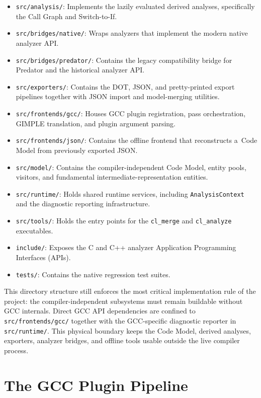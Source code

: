 \documentclass[xpsejal00-gcc-plugin.tex]{subfiles}
\begin{document}
\begin{itemize}
  \item \texttt{src/analysis/}: Implements the lazily evaluated derived analyses, specifically the Call Graph and Switch-to-If.
  \item \texttt{src/bridges/native/}: Wraps analyzers that implement the modern native analyzer API.\@
  \item \texttt{src/bridges/predator/}: Contains the legacy compatibility bridge for Predator and the historical analyzer API.\@
  \item \texttt{src/exporters/}: Contains the DOT, JSON, and pretty-printed export pipelines together with JSON import and model-merging utilities.
  \item \texttt{src/frontends/gcc/}: Houses GCC plugin registration, pass orchestration, GIMPLE translation, and plugin argument parsing.
  \item \texttt{src/frontends/json/}: Contains the offline frontend that reconstructs a~Code Model from previously exported JSON.\@
  \item \texttt{src/model/}: Contains the compiler-independent Code Model, entity pools, visitors, and fundamental intermediate-representation entities.
  \item \texttt{src/runtime/}: Holds shared runtime services, including \texttt{AnalysisContext} and the diagnostic reporting infrastructure.
  \item \texttt{src/tools/}: Holds the entry points for the \texttt{cl\_merge} and \texttt{cl\_analyze} executables.
  \item \texttt{include/}: Exposes the C and C++ analyzer Application Programming Interfaces (APIs).
  \item \texttt{tests/}: Contains the native regression test suites.
\end{itemize}

This directory structure still enforces the most critical implementation rule of the project: the compiler-independent subsystems must remain buildable without GCC internals.
Direct GCC API dependencies are confined to \texttt{src/frontends/gcc/} together with the GCC-specific diagnostic reporter in \texttt{src/runtime/}.
This physical boundary keeps the Code Model, derived analyses, exporters, analyzer bridges, and offline tools usable outside the live compiler process.

\section{The GCC Plugin Pipeline}\label{sec:gcc-plugin-pipeline}
\end{document}
